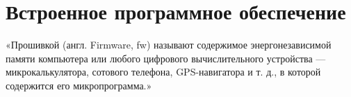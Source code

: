 \section{Встроенное программное обеспечение}
«Прошивкой (англ. Firmware, fw) называют содержимое энергонезависимой памяти компьютера или любого цифрового вычислительного устройства — микрокалькулятора, сотового телефона, GPS-навигатора и т. д., в которой содержится его микропрограмма.» \cite{wiki}




